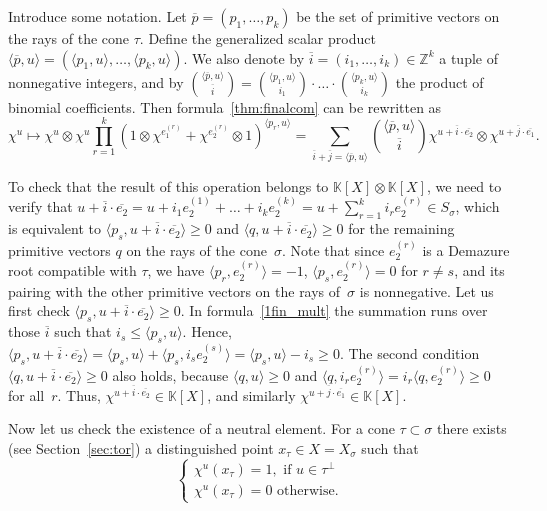\documentclass[a4paper, 11pt]{amsart}
\theoremstyle{plain}
\theoremstyle{remark}
\theoremstyle{definition}
\newcommand{\ZZ}{\mathbb{Z}}
\newcommand{\KK}{\mathbb{K}}
\newcommand{\ol}[1]{\overline{#1}}
\begin{document}
Introduce some notation. Let $\ol{p} = (p_1, \ldots, p_k)$ be the set of primitive vectors on the rays of the cone $\tau$. Define the generalized scalar product $\langle \ol{p}, u \rangle = (\langle p_1, u \rangle, \ldots,  \langle p_k, u \rangle)$. 
We also denote by $\ol{i} = (i_1, \ldots, i_k) \in \ZZ^k$ a tuple of nonnegative integers, and by
${ \langle \ol{p}, u \rangle \choose \ol{i} }  =  { \langle p_1, u \rangle \choose i_1} \cdot \ldots \cdot  { \langle p_k, u \rangle \choose i_k}$
the product of binomial coefficients. Then formula~\eqref{thm:finalcom} can be rewritten as
\begin{equation}\label{1fin_mult}
	\chi^u \mapsto \chi^u \otimes  \chi^u  \prod_{r = 1}^{k} (1 \otimes \chi^{e_1^{(r)}} + \chi^{e_2^{(r)}} \otimes 1)^{\langle p_r, u\rangle} = \sum \limits_{\ol{i} + \ol{j} = \langle \ol{p}, u \rangle } { \langle \ol{p}, u \rangle \choose \ol{i} } \chi^{u + \ol{i}\cdot \ol{e_2}} \otimes \chi^{u + \ol{j}\cdot \ol{e_1}}.
\end{equation}

To check that the result of this operation belongs to $\KK[X] \otimes \KK[X]$, we need to verify that $u + \ol{i}\cdot \ol{e_2} = u + i_1 e_2^{(1)} + \ldots + i_k e_2^{(k)} = u + \sum\limits_{r = 1}^k i_r e_2^{(r)} \in S_\sigma$, which is equivalent to $\langle p_s, u + \ol{i}\cdot \ol{e_2} \rangle \geq 0$ and $\langle q, u + \ol{i}\cdot \ol{e_2} \rangle \geq 0$ for the remaining primitive vectors $q$ on the rays of the cone~$\sigma$. Note that since $e_2^{(r)}$ is a Demazure root compatible with $\tau$, we have $\langle p_r, e_2^{(r)} \rangle = -1$, $\langle p_s, e_2^{(r)} \rangle = 0$ for $r \neq s$, and its pairing with the other primitive vectors on the rays of~$\sigma$ is nonnegative. Let us first check $\langle p_s, u + \ol{i}\cdot \ol{e_2} \rangle \geq 0$. In formula~\eqref{1fin_mult} the summation runs over those $\ol{i}$ such that $i_s \leq \langle p_s, u \rangle$. Hence, $\langle  p_s, u + \ol{i}\cdot \ol{e_2} \rangle = \langle p_s, u \rangle + \langle p_s,  i_s e_2^{(s)} \rangle = \langle  p_s, u \rangle - i_s \geq 0$. The second condition $\langle q, u + \ol{i}\cdot \ol{e_2} \rangle \geq 0$ also holds, because $\langle q, u\rangle \geq 0$ and $\langle q, i_re_2^{(r)}\rangle = i_r \langle q, e_2^{(r)}\rangle \geq 0$ for all~$r$. Thus, $\chi^{u + \ol{i}\cdot \ol{e_2}} \in \KK[X]$, and similarly $\chi^{u + \ol{j}\cdot \ol{e_1}} \in \KK[X]$.

Now let us check the existence of a neutral element. For a cone $\tau \subset \sigma$ there exists (see Section~\ref{sec:tor}) a distinguished point $x_\tau \in X = X_\sigma$ such that
\begin{equation}
	\begin{cases} 
		\chi^u(x_\tau) = 1, \text{ if } u \in \tau^\perp\\
		\chi^u(x_\tau) = 0 \text{ otherwise}.
	\end{cases}
\end{equation}
\end{document}
